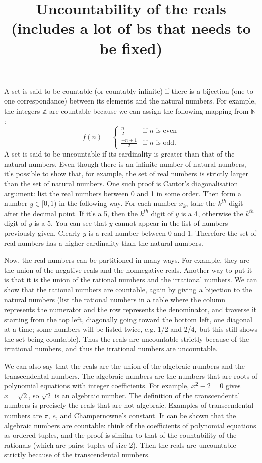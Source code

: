 \documentclass[letterpaper]{article}
\title{Uncountability of the reals (includes a lot of bs that needs to be fixed)}
\numberwithin{equation}{section}
\begin{document}
\maketitle

A set is said to be countable (or countably infinite) if there is a bijection (one-to-one correspondance) between its elements and the natural numbers. For example, the integers $\mathbb{Z}$ are countable because we can assign the following mapping from $\mathbb{N}$:
\[
  f(n)=
  \begin{cases}
    \frac{n}{2} & \text{if $n$ is even}\\
    \frac{-n+1}{2} & \text{if $n$ is odd.}
  \end{cases}
\]
A set is said to be uncountable if its cardinality is greater than that of the natural numbers. Even though there is an infinite number of natural numbers, it's possible to show that, for example, the set of real numbers is strictly larger than the set of natural numbers. One such proof is Cantor's diagonalisation argument: list the real numbers between 0 and 1 in some order. Then form a number $y\in[0,1)$ in the following way. For each number $x_k$, take the $k^{th}$ digit after the decimal point. If it's a 5, then the $k^{th}$ digit of $y$ is a 4, otherwise the $k^{th}$ digit of $y$ is a 5. You can see that $y$ cannot appear in the list of numbers previously given. Clearly $y$ is a real number between 0 and 1. Therefore the set of real numbers has a higher cardinality than the natural numbers.

Now, the real numbers can be partitioned in many ways. For example, they are the union of the negative reals and the nonnegative reals. Another way to put it is that it is the union of the rational numbers and the irrational numbers. We can show that the rational numbers are countable, again by giving a bijection to the natural numbers (list the rational numbers in a table where the column represents the numerator and the row represents the denominator, and traverse it starting from the top left, diagonally going toward the bottom left, one diagonal at a time; some numbers will be listed twice, e.g. 1/2 and 2/4, but this still shows the set being countable). Thus the reals are uncountable strictly because of the irrational numbers, and thus the irrational numbers are uncountable.

We can also say that the reals are the union of the algebraic numbers and the transcendental numbers. The algebraic numbers are the numbers that are roots of polynomial equations with integer coefficients. For example, $x^2-2=0$ gives $x=\sqrt{2}$, so $\sqrt{2}$ is an algebraic number. The definition of the transcendental numbers is precisely the reals that are not algebraic. Examples of transcendental numbers are $\pi$, $e$, and Champernowne's constant. It can be shown that the algebraic numbers are countable: think of the coefficients of polynomial equations as ordered tuples, and the proof is similar to that of the countability of the rationals (which are pairs: tuples of size 2). Then the reals are uncountable strictly because of the transcendental numbers.
\end{document}
